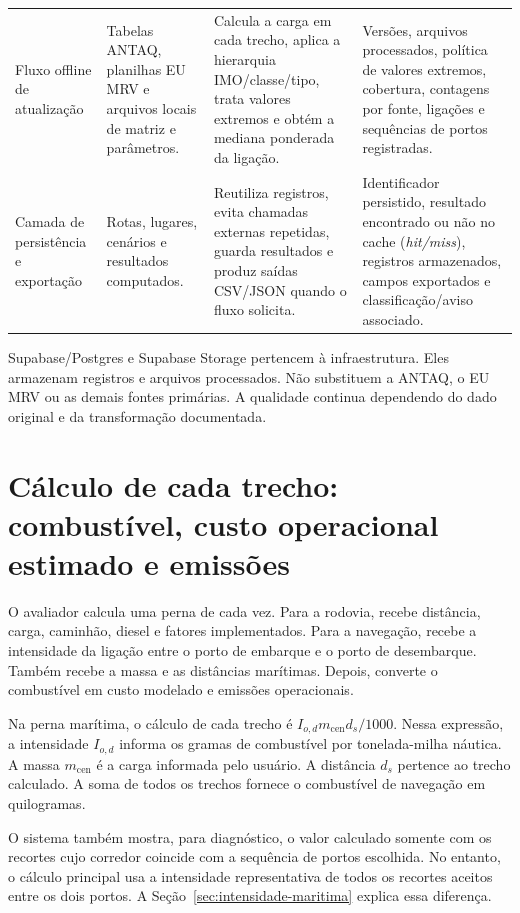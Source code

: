 \begin{table}[htbp]
\begin{tabularx}{\textwidth}{L{0.22\textwidth}L{0.23\textwidth}Y Y}
Fluxo offline de atualização & Tabelas ANTAQ, planilhas EU MRV e arquivos locais de matriz e parâmetros. & Calcula a carga em cada trecho, aplica a hierarquia IMO/classe/tipo, trata valores extremos e obtém a mediana ponderada da ligação. & Versões, arquivos processados, política de valores extremos, cobertura, contagens por fonte, ligações e sequências de portos registradas.\\
Camada de persistência e exportação & Rotas, lugares, cenários e resultados computados. & Reutiliza registros, evita chamadas externas repetidas, guarda resultados e produz saídas CSV/JSON quando o fluxo solicita. & Identificador persistido, resultado encontrado ou não no cache (\emph{hit/miss}), registros armazenados, campos exportados e classificação/aviso associado.\\
\bottomrule
\end{tabularx}
\end{table}

Supabase/Postgres e Supabase Storage pertencem à infraestrutura. Eles armazenam registros e arquivos processados. Não substituem a ANTAQ, o EU MRV ou as demais fontes primárias. A qualidade continua dependendo do dado original e da transformação documentada.

\section{Cálculo de cada trecho: combustível, custo operacional estimado e emissões}
\label{sec:calculo-por-perna}

O avaliador calcula uma perna de cada vez. Para a rodovia, recebe distância, carga, caminhão, diesel e fatores implementados. Para a navegação, recebe a intensidade da ligação entre o porto de embarque e o porto de desembarque. Também recebe a massa e as distâncias marítimas. Depois, converte o combustível em custo modelado e emissões operacionais.

Na perna marítima, o cálculo de cada trecho é \(I_{o,d}m_{\mathrm{cen}}d_s/1000\). Nessa expressão, a intensidade \(I_{o,d}\) informa os gramas de combustível por tonelada-milha náutica. A massa \(m_{\mathrm{cen}}\) é a carga informada pelo usuário. A distância \(d_s\) pertence ao trecho calculado. A soma de todos os trechos fornece o combustível de navegação em quilogramas.

O sistema também mostra, para diagnóstico, o valor calculado somente com os recortes cujo corredor coincide com a sequência de portos escolhida. No entanto, o cálculo principal usa a intensidade representativa de todos os recortes aceitos entre os dois portos. A Seção~\ref{sec:intensidade-maritima} explica essa diferença.

